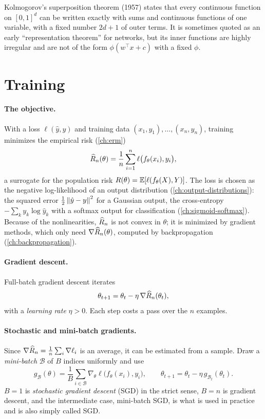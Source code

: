 \begin{notechapter}
\begin{remark}
Kolmogorov's superposition theorem (1957) states that every continuous function on $[0,1]^d$ can
be written exactly with sums and continuous functions of one variable, with a fixed number
$2d + 1$ of outer terms. It is sometimes quoted as an early ``representation theorem'' for
networks, but its inner functions are highly irregular and are not of the form
$\phi(w^\top x + c)$ with a fixed $\phi$.
\end{remark}

\section{Training}\label{feedforward-networks:sec:training}

\paragraph{The objective.} With a loss $\ell(\hat y, y)$ and training data $(x_1,y_1),\dots,(x_n,y_n)$, training
minimizes the empirical risk (\cref{ch:erm})
\[
  \widehat{R}_n(\theta) = \frac1n\sum_{i=1}^n\ell\bigl(f_\theta(x_i), y_i\bigr),
\]
a surrogate for the population risk $R(\theta) = \mathbb{E}[\ell(f_\theta(X), Y)]$. The loss is chosen as the
negative log-likelihood of an output distribution (\cref{ch:output-distributions}): the
squared error $\frac12\left\|\hat y - y\right\|^2$ for a Gaussian output, the cross-entropy $-\sum_ky_k\log\hat y_k$ with a
softmax output for classification (\cref{ch:sigmoid-softmax}). Because of the
nonlinearities, $\widehat{R}_n$ is not convex in $\theta$; it is minimized by gradient methods, which only
need $\nabla\widehat{R}_n(\theta)$, computed by backpropagation (\cref{ch:backpropagation}).

\paragraph{Gradient descent.} Full-batch gradient descent iterates
\[
  \theta_{t+1} = \theta_t - \eta\,\nabla\widehat{R}_n(\theta_t),
\]
with a \emph{learning rate} $\eta>0$. Each step costs a pass over the $n$ examples.

\paragraph{Stochastic and mini-batch gradients.} Since $\nabla\widehat{R}_n = \frac1n\sum_i\nabla\ell_i$ is an average, it can be
estimated from a sample. Draw a \emph{mini-batch} $\mathcal B$ of $B$ indices uniformly and use
\[
  g_{\mathcal B}(\theta) = \frac1B\sum_{i\in\mathcal B}\nabla_\theta\ell\bigl(f_\theta(x_i), y_i\bigr),\qquad
  \theta_{t+1} = \theta_t - \eta\,g_{\mathcal B_t}(\theta_t) .
\]
$B = 1$ is \emph{stochastic gradient descent} (SGD) in the strict sense, $B = n$ is gradient
descent, and the intermediate case, mini-batch SGD, is what is used in practice and is
also simply called SGD.


\end{notechapter}
